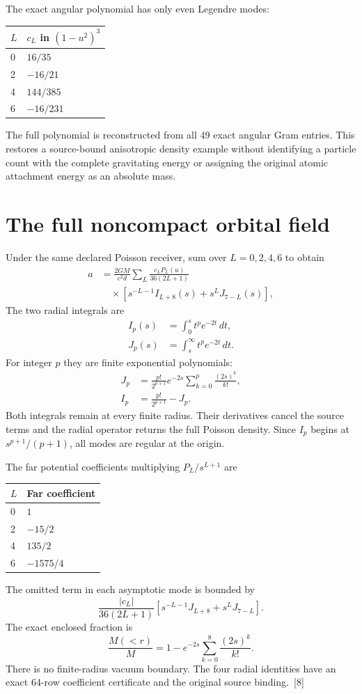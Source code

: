 \documentclass[10pt,twocolumn,letterpaper]{article}
\begin{document}
The exact angular polynomial has only even Legendre modes:
\begin{center}\small
\begin{tabular}{@{}ll@{}}\toprule
$L$ & $c_L$ in $(1-u^2)^3$\\\midrule
0 & $16/35$\\
2 & $-16/21$\\
4 & $144/385$\\
6 & $-16/231$\\\bottomrule
\end{tabular}\end{center}
The full polynomial is reconstructed from all 49 exact angular Gram entries. This restores a source-bound anisotropic density example without identifying a particle count with the complete gravitating energy or assigning the original atomic attachment energy as an absolute mass.

\section{The full noncompact orbital field}
Under the same declared Poisson receiver, sum over $L=0,2,4,6$ to obtain
\[
\begin{aligned}
a&=\frac{2GM}{c^2d}\sum_L\frac{c_LP_L(u)}{36(2L+1)}\\
&\quad\times[s^{-L-1}I_{L+8}(s)+s^LJ_{7-L}(s)],
\end{aligned}
\]
The two radial integrals are
\[
\begin{aligned}
I_p(s)&=\int_0^s t^pe^{-2t}\,dt,\\
J_p(s)&=\int_s^\infty t^pe^{-2t}\,dt.
\end{aligned}
\]
For integer $p$ they are finite exponential polynomials:
\[
\begin{aligned}
J_p&=\frac{p!}{2^{p+1}}e^{-2s}\sum_{k=0}^p\frac{(2s)^k}{k!},\\
I_p&=\frac{p!}{2^{p+1}}-J_p.
\end{aligned}
\]
Both integrals remain at every finite radius. Their derivatives cancel the source terms and the radial operator returns the full Poisson density. Since $I_p$ begins at $s^{p+1}/(p+1)$, all modes are regular at the origin.

The far potential coefficients multiplying $P_L/s^{L+1}$ are
\begin{center}\small
\begin{tabular}{@{}ll@{}}\toprule
$L$ & Far coefficient\\\midrule
0 & $1$\\
2 & $-15/2$\\
4 & $135/2$\\
6 & $-1575/4$\\\bottomrule
\end{tabular}\end{center}
The omitted term in each asymptotic mode is bounded by
\[
\frac{|c_L|}{36(2L+1)}[s^{-L-1}J_{L+8}+s^LJ_{7-L}].
\]
The exact enclosed fraction is
\[
\frac{M(<r)}M=1-e^{-2s}\sum_{k=0}^8\frac{(2s)^k}{k!}.
\]
There is no finite-radius vacuum boundary. The four radial identities have an exact 64-row coefficient certificate and the original source binding.~[8]
\end{document}
